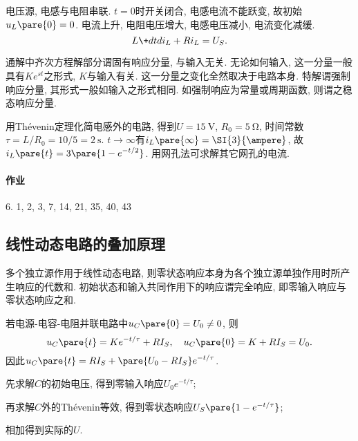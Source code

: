\documentclass{ctexart}
\begin{document}
电压源, 电感与电阻串联. $t=0$时开关闭合, 电感电流不能跃变, 故初始$u_L\pare{0} = 0$. 电流上升, 电阻电压增大, 电感电压减小, 电流变化减缓.
\[ L\+dtd{i_L} + Ri_L = U_S. \]
\begin{remark}
    通解中齐次方程解部分谓固有响应分量, 与输入无关. 无论如何输入, 这一分量一般具有$Ke^{st}$之形式, $K$与输入有关. 这一分量之变化全然取决于电路本身. 特解谓强制响应分量, 其形式一般如输入之形式相同. 如强制响应为常量或周期函数, 则谓之稳态响应分量.
\end{remark}
\begin{sample}
    \begin{ex}
    \end{ex}
    \begin{solution}
        用Th\'evenin定理化简电感外的电路, 得到$U = \SI{15}{\volt}$, $R_0 = \SI{5}{\ohm}$, 时间常数$\tau = L/R_0 = 10/5 = \SI{2}{\second}$. $t \rightarrow \infty$有$i_L\pare{\infty} = \SI{3}{\ampere}$, 故$\displaystyle i_L\pare{t} = \displaystyle 3\pare{1-e^{-t/2}}$. 用网孔法可求解其它网孔的电流.
    \end{solution}
\end{sample}


\paragraph{作业} %
\label{par:作业}

6. 1, 2, 3, 7, 14, 21, 35, 40, 43


\subsection{线性动态电路的叠加原理} %
\label{sub:线性动态电路的叠加原理}

多个独立源作用于线性动态电路, 则零状态响应本身为各个独立源单独作用时所产生响应的代数和. 初始状态和输入共同作用下的响应谓完全响应, 即零输入响应与零状态响应之和.

\begin{sample}
    \begin{ex}
        若电源-电容-电阻并联电路中$u_C\pare{0} = U_0 \neq 0$, 则
        \[ u_C\pare{t} = Ke^{-t/\tau} + RI_S,\quad u_C\pare{0} = K+RI_S = U_0. \]
        因此$\displaystyle u_C\pare{t} = RI_S + \pare{U_0 - RI_S}e^{-t/\tau}$.
    \end{ex}
\end{sample}
\begin{cenum}
    \item 先求解$C$的初始电压, 得到零输入响应$U_0 e^{-t/\tau}$;
    \item 再求解$C$外的Th\'evenin等效, 得到零状态响应$U_S\pare{1-e^{-t/\tau}}$;
    \item 相加得到实际的$U$.
\end{cenum}
\end{document}
